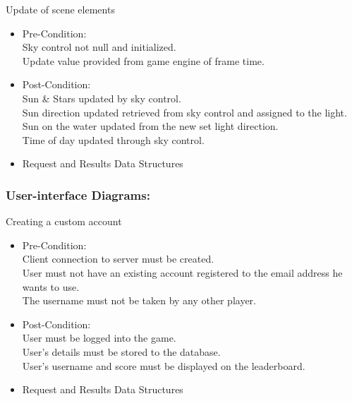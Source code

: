 \documentclass[letterpaper]{article}
\begin{document}
					\vspace{0.1in}
					Update of scene elements
					\begin{itemize}
						\item Pre-Condition: \\
							Sky control not null and initialized. \\
							Update value provided from game engine of frame time.
						\item Post-Condition: \\
							Sun \& Stars updated by sky control. \\
							Sun direction updated retrieved from sky control and assigned to the light. \\
							Sun on the water updated from the new set light direction. \\
							Time of day updated through sky control.
						\item Request and Results Data Structures \\
						
					\end{itemize}
					
				\vspace{0.2in}
				\subsubsection*{User-interface Diagrams:}
				\vspace{0.2in}
				
				\vspace{0.1in}
					\hspace{5mm}Creating a custom account
					\begin{itemize}
						\item Pre-Condition: \\
							Client connection to server must be created. \\
							User must not have an existing account registered to the email address he wants to use. \\
							 The username must not be taken by any other player. \\
						\item Post-Condition: \\				
							User must be logged into the game. \\
							User's details must be stored to the database. \\
							User's username and score must be displayed on the leaderboard. 
						\item Request and Results Data Structures \\
						
					\end{itemize}
					
\end{document}
